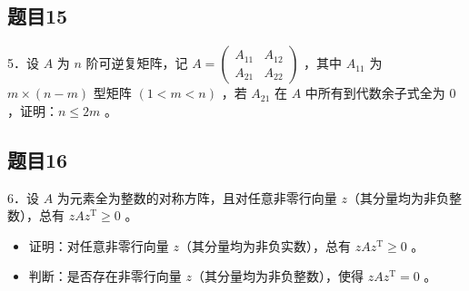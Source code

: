 \documentclass{article}
\begin{document}
\subsection{题目15}
5．设 \(A\) 为 \(n\) 阶可逆复矩阵，记 \(A=\left(\begin{array}{cc}A_{11} & A_{12} \\ A_{21} & A_{22}\end{array}\right)\) ，其中 \(A_{11}\) 为 \(m \times(n-m)\) 型矩阵 \((1<m<n)\) ，若 \(A_{21}\) 在 \(A\) 中所有到代数余子式全为 0 ，证明：\(n \leq 2 m\) 。

\subsection{题目16}
6．设 \(A\) 为元素全为整数的对称方阵，且对任意非零行向量 \(z\)（其分量均为非负整数），总有 \(z A z^{\mathrm{T}} \geq 0\) 。

\begin{itemize}
  \item[（1）] 证明：对任意非零行向量 \(z\)（其分量均为非负实数），总有 \(z A z^{\mathrm{T}} \geq 0\) 。
  \item[（2）] 判断：是否存在非零行向量 \(z\)（其分量均为非负整数），使得 \(z A z^{\mathrm{T}}=0\) 。
\end{itemize}
\end{document}
